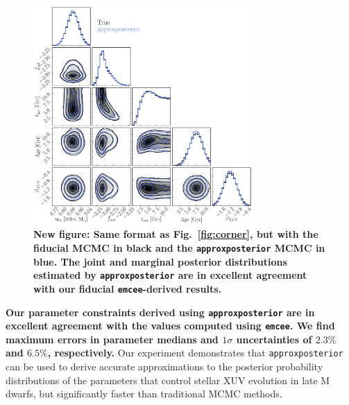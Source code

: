 \documentclass[twocolumn]{aastex62}
\newcommand{\xxx}[1]{{\textbf{#1}}}
\newcommand{\emcee}[0]{\texttt{emcee}\xspace}
\newcommand{\approxposterior}[0]{\texttt{approxposterior}\xspace}
\begin{document}
\begin{figure}[t]
\centering
	\includegraphics[width=0.75\textwidth]{../Analysis/Approx/stacked.pdf}
   \caption{\xxx{New figure: Same format as Fig.~\ref{fig:corner}, but with the fiducial MCMC in black and the \approxposterior MCMC in blue. \textbf{The joint and marginal posterior distributions estimated by \approxposterior are in excellent agreement with our fiducial \emcee-derived results.}}}%
    \label{fig:stacked}%
\end{figure}

\textbf{Our parameter constraints derived using \approxposterior are in excellent agreement with the values computed using \emcee. We find maximum errors in parameter medians and $1\sigma$ uncertainties of $2.3\%$ and $6.5\%$, respectively.} Our experiment demonstrates that \approxposterior can be used to derive accurate approximations to the posterior probability distributions of the parameters that control stellar XUV evolution in late M dwarfs, but significantly faster than traditional MCMC methods.

\end{document}
